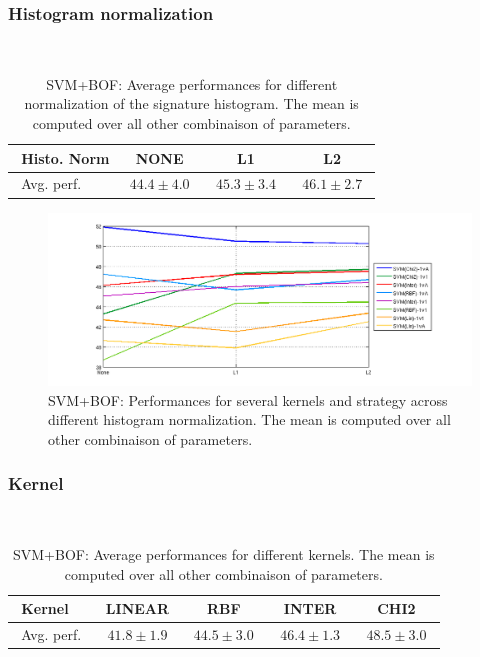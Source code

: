 \documentclass[10pt,a4paper]{llncs}
\begin{document}
\subsubsection{Histogram normalization}$~$\\

\begin{table}[H]
\centering
\caption{SVM+BOF: Average performances for different normalization of the signature histogram. The mean is computed over all other combinaison of parameters.}
\label{table:SVM_BOF:Histonorm}
\begin{tabular}{|l|c|c|c|}
\hline
$~~$Histo. Norm & NONE & L1 & L2 \\ \hline
$~~$Avg. perf.$~~$ & $~~44.4 \pm 4.0~~$ & $~~45.3 \pm 3.4~~$ & $~~\mathbf{46.1 \pm 2.7}~~$ \\ \hline
\end{tabular}
\end{table}


\begin{figure}[H]
\centering
\caption{SVM+BOF: Performances for several kernels and strategy across different histogram normalization. The mean is computed over all other combinaison of parameters.}
\label{fig:SVM_BOF:SIZE_K_graph}
\includegraphics[scale=0.5]{img/SVM_BOF_graph_Norm.png}
\end{figure}

\subsubsection{Kernel}$~$\\

\begin{table}[H]
\centering
\caption{SVM+BOF: Average performances for different kernels. The mean is computed over all other combinaison of parameters.}
\label{table:SVM_BOF:Kernel}
\begin{tabular}{|l|c|c|c|c|}
\hline
$~~$Kernel & LINEAR & RBF & INTER & CHI2\\ \hline
$~~$Avg. perf.$~~$ & $~~41.8 \pm 1.9~~$ & $~~44.5 \pm 3.0~~$ & $~~46.4 \pm 1.3~~$ & $~~\mathbf{48.5 \pm 3.0}~~$\\ \hline
\end{tabular}
\end{table}
\end{document}
